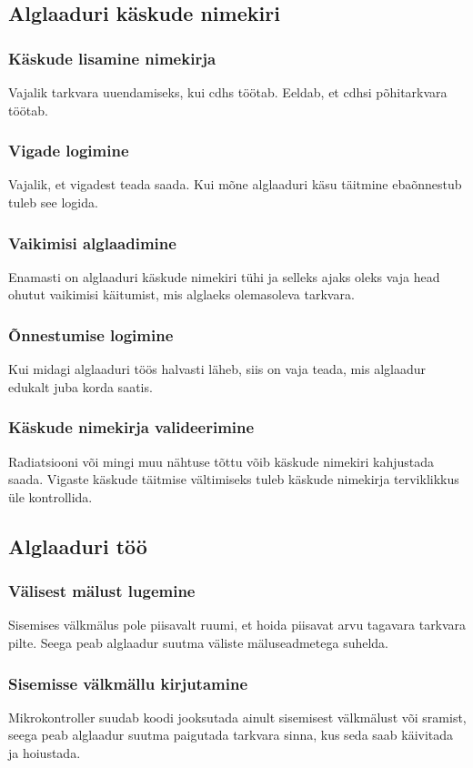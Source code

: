 \documentclass[12pt,a4paper]{article}
\begin{document}
\subsection{Alglaaduri käskude nimekiri}
\subsubsection{Käskude lisamine nimekirja}
Vajalik tarkvara uuendamiseks, kui \gls{cdhs} töötab. Eeldab, et \gls{cdhs}i põhitarkvara
töötab.

\subsubsection{Vigade logimine}
Vajalik, et vigadest teada saada. Kui mõne alglaaduri käsu täitmine ebaõnnestub
tuleb see logida.

\subsubsection{Vaikimisi alglaadimine}
Enamasti on alglaaduri käskude nimekiri tühi ja selleks ajaks oleks vaja head
ohutut vaikimisi käitumist, mis alglaeks olemasoleva tarkvara.

\subsubsection{Õnnestumise logimine}
Kui midagi alglaaduri töös halvasti läheb, siis on vaja teada, mis alglaadur
edukalt juba korda saatis.

\subsubsection{Käskude nimekirja valideerimine}
Radiatsiooni või mingi muu nähtuse tõttu võib käskude nimekiri kahjustada saada.
Vigaste käskude täitmise vältimiseks tuleb käskude nimekirja terviklikkus üle
kontrollida.

\subsection{Alglaaduri töö}
\subsubsection{Välisest mälust lugemine}
Sisemises välkmälus pole piisavalt ruumi, et hoida piisavat arvu tagavara
tarkvara pilte. Seega peab alglaadur suutma väliste mäluseadmetega suhelda.

\subsubsection{Sisemisse välkmällu kirjutamine}
Mikrokontroller suudab koodi jooksutada ainult sisemisest välkmälust või
\gls{sram}ist, seega peab alglaadur suutma paigutada tarkvara sinna, kus seda saab
käivitada ja hoiustada.
\end{document}
